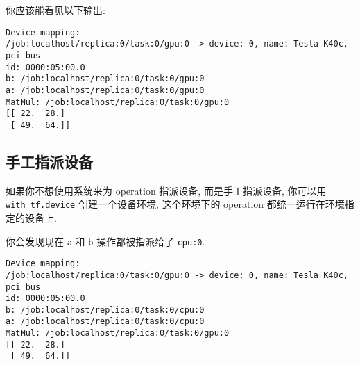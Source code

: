 你应该能看见以下输出:

\begin{verbatim}
Device mapping:
/job:localhost/replica:0/task:0/gpu:0 -> device: 0, name: Tesla K40c, pci bus
id: 0000:05:00.0
b: /job:localhost/replica:0/task:0/gpu:0
a: /job:localhost/replica:0/task:0/gpu:0
MatMul: /job:localhost/replica:0/task:0/gpu:0
[[ 22.  28.]
 [ 49.  64.]]
\end{verbatim}

\subsection{手工指派设备 }\label{ux624bux5de5ux6307ux6d3eux8bbeux5907}

如果你不想使用系统来为 operation 指派设备, 而是手工指派设备, 你可以用
\texttt{with\ tf.device} 创建一个设备环境, 这个环境下的 operation
都统一运行在环境指定的设备上.

\begin{Shaded}
\begin{Highlighting}[]
 \NormalTok{):}
  \OperatorTok{=} \NormalTok{tf.constant([}\NormalTok{, }\NormalTok{, }\NormalTok{, }\NormalTok{, }\NormalTok{, }\NormalTok{], shape}\OperatorTok{=}\NormalTok{[}\NormalTok{, }\NormalTok{], name}\OperatorTok{=}\NormalTok{)}
  \OperatorTok{=} \NormalTok{tf.constant([}\NormalTok{, }\NormalTok{, }\NormalTok{, }\NormalTok{, }\NormalTok{, }\NormalTok{], shape}\OperatorTok{=}\NormalTok{[}\NormalTok{, }\NormalTok{], name}\OperatorTok{=}\NormalTok{)}
\OperatorTok{=} 
\OperatorTok{=} \OperatorTok{=}\OperatorTok{=}\NormalTok{))}
 
\end{Highlighting}
\end{Shaded}

你会发现现在 \texttt{a} 和 \texttt{b} 操作都被指派给了 \texttt{cpu:0}.

\begin{verbatim}
Device mapping:
/job:localhost/replica:0/task:0/gpu:0 -> device: 0, name: Tesla K40c, pci bus
id: 0000:05:00.0
b: /job:localhost/replica:0/task:0/cpu:0
a: /job:localhost/replica:0/task:0/cpu:0
MatMul: /job:localhost/replica:0/task:0/gpu:0
[[ 22.  28.]
 [ 49.  64.]]
\end{verbatim}

